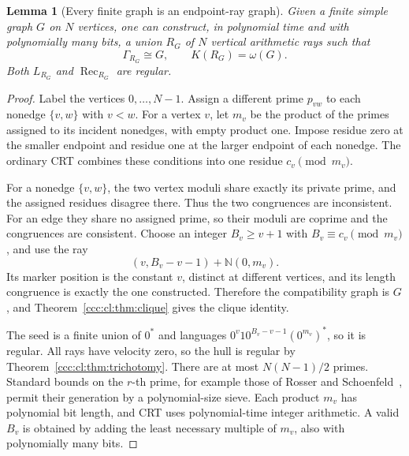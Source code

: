\documentclass[11pt,letterpaper]{article}
\newtheorem{lemma}[theorem]{Lemma}
\theoremstyle{definition}
\theoremstyle{remark}
\newcommand{\N}{\mathbb N}
\newcommand{\rec}{\operatorname{Rec}}
\begin{document}
\begin{lemma}[Every finite graph is an endpoint-ray graph]\label{ccc:cl:lem:graphrealize}
Given a finite simple graph $G$ on $N$ vertices, one can construct, in
polynomial time and with polynomially many bits, a union $R_G$ of $N$
vertical arithmetic rays such that
\[
 \Gamma_{R_G}\cong G,\qquad K(R_G)=\omega(G).
\]
Both $L_{R_G}$ and $\rec_{R_G}$ are regular.
\end{lemma}
\begin{proof}
Label the vertices $0,\ldots,N-1$. Assign a different prime $p_{vw}$ to
each nonedge $\{v,w\}$ with $v<w$. For a vertex $v$, let $m_v$ be the
product of the primes assigned to its incident nonedges, with empty
product one. Impose residue zero at the smaller endpoint and residue one
at the larger endpoint of each nonedge. The ordinary CRT combines these
conditions into one residue $c_v\pmod{m_v}$.

For a nonedge $\{v,w\}$, the two vertex moduli share exactly its private
prime, and the assigned residues disagree there. Thus the two congruences
are inconsistent. For an edge they share no assigned prime, so their
moduli are coprime and the congruences are consistent. Choose an integer
$B_v\ge v+1$ with $B_v\equiv c_v\pmod{m_v}$, and use the ray
\begin{equation}\label{ccc:cl:eq:reductionray}
 (v,B_v-v-1)+\N(0,m_v).
\end{equation}
Its marker position is the constant $v$, distinct at different vertices,
and its length congruence is exactly the one constructed. Therefore the
compatibility graph is $G$, and Theorem~\ref{ccc:cl:thm:clique} gives the clique
identity.

The seed is a finite union of $0^*$ and languages
$0^v1 0^{B_v-v-1}(0^{m_v})^*$, so it is regular. All rays have velocity
zero, so the hull is regular by Theorem~\ref{ccc:cl:thm:trichotomy}.
There are at most $N(N-1)/2$ primes. Standard bounds on the $r$-th prime,
for example those of Rosser and Schoenfeld~\cite{Rosser}, permit their
generation by a polynomial-size sieve. Each product $m_v$ has polynomial
bit length, and CRT uses polynomial-time integer arithmetic. A valid
$B_v$ is obtained by adding the least necessary multiple of $m_v$, also
with polynomially many bits.
\end{proof}
\end{document}
